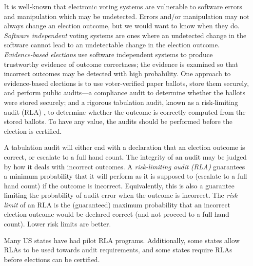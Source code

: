 It is well-known that electronic voting systems are vulnerable to software errors and manipulation which may be undetected. Errors and/or manipulation may not always change an election outcome, but we would want to know when they do. {\em Software independent} voting systems \cite{SI-Wack,rivest2008notion} are ones where an undetected change in the software cannot lead to an undetectable change in the election outcome. {\em Evidence-based elections} \cite{evidence-based} use software independent systems to produce trustworthy evidence of outcome correctness; the evidence is examined so that incorrect outcomes may be detected with high probability. One approach to evidence-based elections is to use voter-verified paper ballots, store them securely, and perform public audits---a compliance audit to determine whether the ballots were stored securely; and a rigorous tabulation audit, known as a risk-limiting audit (RLA) \cite{RLA}, to determine whether the outcome is correctly computed from the stored ballots. To have any value, the audits should be performed before the election is certified. 

A tabulation audit will either end with a declaration that an election outcome is correct, or escalate to a full hand count. The integrity of an audit may be judged by how it deals with incorrect outcomes. A {\em risk-limiting audit (RLA)} guarantees a minimum probability that it will perform as it is supposed to (escalate to a full hand count) if the outcome is incorrect. Equivalently, this is also a guarantee limiting the probability of audit error when the outcome is incorrect. The {\em risk limit} of an RLA is the (guaranteed) maximum probability that an incorrect election outcome would be declared correct (and not proceed to a full hand count). Lower risk limits are better. 

Many US states have had pilot RLA programs. Additionally, some states allow RLAs to be used towards audit requirements, and some states require RLAs before elections can be certified. 


